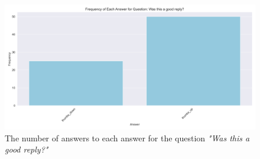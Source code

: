 \begin{figure}[H]
    \centering
    \includegraphics[width=\textwidth]{results/plots/assets/feedback-01-frequency-of-answer-for-question-2e09fd.png}
    \caption{The number of answers to each answer for the question \textit{"Was this a good reply?"}}
    \label{fig:feedback_01_frequency_of_answer_for_question_2e09fd}
\end{figure}
